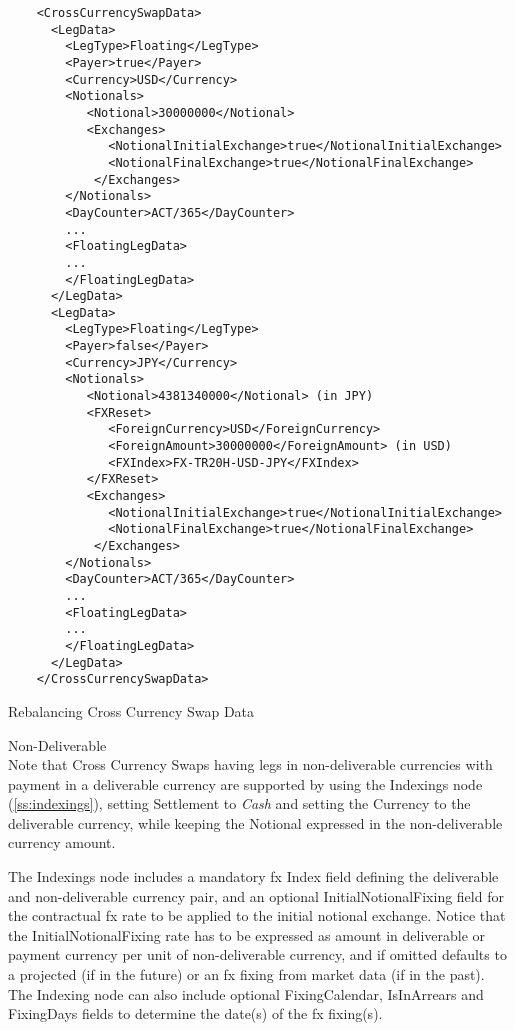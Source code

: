 \begin{listing}[H]
\begin{verbatim}
    <CrossCurrencySwapData>
      <LegData>
        <LegType>Floating</LegType>
        <Payer>true</Payer>
        <Currency>USD</Currency>
        <Notionals>
           <Notional>30000000</Notional>
           <Exchanges>
              <NotionalInitialExchange>true</NotionalInitialExchange>
              <NotionalFinalExchange>true</NotionalFinalExchange>
            </Exchanges>
        </Notionals>
        <DayCounter>ACT/365</DayCounter>
        ...
        <FloatingLegData>
        ...
        </FloatingLegData>
      </LegData>
      <LegData>
        <LegType>Floating</LegType>
        <Payer>false</Payer>
        <Currency>JPY</Currency>
        <Notionals>
           <Notional>4381340000</Notional> (in JPY)
           <FXReset>
              <ForeignCurrency>USD</ForeignCurrency>
              <ForeignAmount>30000000</ForeignAmount> (in USD)
              <FXIndex>FX-TR20H-USD-JPY</FXIndex>
           </FXReset>
           <Exchanges>
              <NotionalInitialExchange>true</NotionalInitialExchange>
              <NotionalFinalExchange>true</NotionalFinalExchange>
            </Exchanges>
        </Notionals> 
        <DayCounter>ACT/365</DayCounter>
        ...
        <FloatingLegData>
        ...
        </FloatingLegData>
      </LegData>
    </CrossCurrencySwapData>
\end{verbatim}
\caption{Rebalancing Cross Currency Swap Data}
\label{lst:crosscurrencyswapreset}
\end{listing}

Non-Deliverable\\
Note that Cross Currency Swaps having legs in non-deliverable currencies with payment in a deliverable currency are supported by using the Indexings node (\ref{ss:indexings}), setting Settlement  to \emph{Cash} and setting the Currency to the deliverable currency, while keeping the Notional expressed in the non-deliverable currency amount. 

The Indexings node includes a mandatory fx Index field defining the deliverable and non-deliverable currency pair, and an optional InitialNotionalFixing field for the contractual fx rate to be applied to the initial notional exchange. Notice that the InitialNotionalFixing rate has to be expressed as amount in deliverable or payment currency per unit of non-deliverable currency, and if omitted defaults to a projected (if in the future) or an fx fixing from market data (if in the past).  The Indexing node can also include optional FixingCalendar, IsInArrears and FixingDays fields to determine the date(s) of the fx fixing(s).

